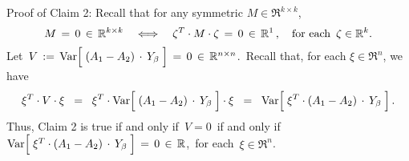 \vskip 0.3cm
\noindent
Proof of Claim 2:\quad
Recall that for any symmetric $M \in \Re^{k \times k}$,
\begin{equation*}
M \,=\, 0 \,\in\, \Re^{k \times k}
\quad\Longleftrightarrow\quad
\zeta^{T} \cdot M \cdot \zeta \,=\, 0 \,\in\, \Re^{1}\,,
\quad
\textnormal{for each \,$\zeta\in\Re^{k}$}.
\end{equation*}
Let
\,$V \,:=\, \Var\!\left[\;(A_{1} - A_{2}) \overset{{\color{white}-}}{\cdot} Y_{\beta}\;\right] \,=\, 0 \,\in\, \Re^{n \times n}$.\,
Recall that, for each $\xi\in\Re^{n}$, we have
\begin{equation*}
\xi^{T} \cdot V \cdot \xi
\;\;=\;\; \xi^{T} \cdot \Var\!\left[\;(A_{1} - A_{2}) \overset{{\color{white}-}}{\cdot} Y_{\beta}\;\right] \cdot \xi
\;\;=\;\; \Var\!\left[\;\xi^{T} \cdot (A_{1} - A_{2}) \overset{{\color{white}-}}{\cdot} Y_{\beta}\;\right].
\end{equation*}
Thus, Claim 2 is true if and only if \,$V = 0$\, if and only if
\,$\Var\!\left[\;\xi^{T} \cdot (A_{1} - A_{2}) \overset{{\color{white}-}}{\cdot} Y_{\beta}\;\right] \,=\, 0 \,\in\, \Re$,\,
for each \,$\xi \in \Re^{n}$.

